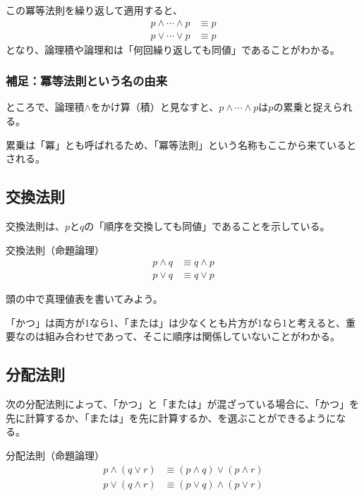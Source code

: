 \documentclass[../../imaging-math]{subfiles}
\begin{document}
\br

この冪等法則を繰り返して適用すると、
\begin{align*}
  p \land \cdots \land p & \equiv p \\
  p \lor \cdots \lor p   & \equiv p
\end{align*}
となり、論理積や論理和は「何回繰り返しても同値」であることがわかる。

\subsubsection{補足：冪等法則という名の由来}

ところで、論理積$\land$をかけ算（積）と見なすと、$  p \land \cdots \land p$は$p$の累乗と捉えられる。

累乗は「冪」とも呼ばれるため、「冪等法則」という名称もここから来ているとされる。

\subsection{交換法則}

交換法則は、$p$と$q$の「順序を交換しても同値」であることを示している。

\begin{theorem}{交換法則（命題論理）}
  \large
  \begin{align*}
    p \land q & \equiv q \land p \\
    p \lor q  & \equiv q \lor p
  \end{align*}
\end{theorem}

頭の中で真理値表を書いてみよう。

「かつ」は両方が1なら1、「または」は少なくとも片方が1なら1と考えると、重要なのは組み合わせであって、そこに順序は関係していないことがわかる。

\subsection{分配法則}

次の分配法則によって、「かつ」と「または」が混ざっている場合に、「かつ」を先に計算するか、「または」を先に計算するか、を選ぶことができるようになる。

\begin{theorem}{分配法則（命題論理）}
  \Large
  \begin{align*}
    p \land (q \lor r) & \equiv (p \land q) \lor (p \land r) \\
    p \lor (q \land r) & \equiv (p \lor q) \land (p \lor r)
  \end{align*}
\end{theorem}
\end{document}
